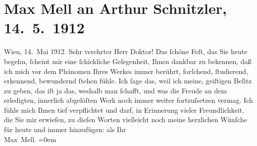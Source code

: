 

               \section[Max Mell an Arthur Schnitzler, 14. 5. 1912]{ Max Mell an Arthur Schnitzler, 14. 5. 1912}\nopagebreak{}\rehead{ }\begin{ledgroupsized}[t]{13cm}\normalsize\beginnumbering{} \toendnotes[C]{\smallbreak\pagebreak[2]} 
\pstart
           \raggedleft{}{\pb}Wien, 14. Mai 1912.\pend
           \pstart{}Sehr verehrter Herr Doktor!\pend\pstart
           Das ſchöne Feſt, das Sie heute begehn, ſcheint mir eine ſchickliche Gelegenheit, Ihnen
               dankbar zu bekennen, daß ich mich vor dem Phänomen Ihres Werkes immer berührt,
               forſchend, ſtudierend, erkennend, bewundernd ſtehen fühle. Ich ſage das, weil ich
               meine, geiſtigen Beſitz zu geben, das iſt ja das, weshalb man ſchafft, und was die
               Freude an dem erledigten, innerlich abgelöſten Werk noch immer weiter fortzuſsetzen
               vermag. Ich fühle mich Ihnen tief verpflichtet und darf, in Erinnerung vieler
               Freundlichkeit, die Sie mir erwieſen, zu dieſen Worten vielleicht noch meine
               herzlichen Wünſche für heute und immer hinzufügen:\pend
           \pstart
           als Ihr{\\[\baselineskip]}\spacefill\mbox{Max Mell.}\pend
           \leftskip=0em{}          \endnumbering{}\end{ledgroupsized}  \newcommand{\dateiname}{L02065}\newcommand{\titel}{Max Mell an Arthur Schnitzler, 14. 5. 1912}\newcommand{\editorInnen}{Martin Anton Müller und Gerd-Hermann Susen}
      